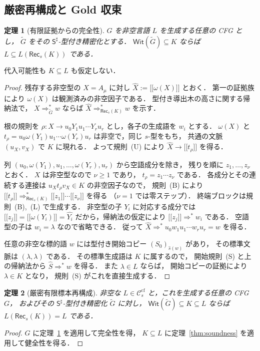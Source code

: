 \documentclass[11pt,a4paper]{ltjsarticle}
\newcommand{\NT}[1]{\mathopen{[\![}#1\mathclose{]\!]}}
\newtheorem{theorem}{定理}[section]
\theoremstyle{remark}
\theoremstyle{plain}
\newcommand{\WitnessSet}{\mathsf{Wit}}
\newcommand{\cf}{\mathrm{cf}}
\newcommand{\Ccf}[1]{\mathcal C_{#1}^{\cf}}
\begin{document}
\subsection{厳密再構成と Gold 収束}

\begin{theorem}[有限証拠からの完全性]\label{thm:complete}
$G$ を非空言語 $L$ を生成する任意の CFG とし，
$\widetilde G$ をその $\mathsf S^\sharp$-型付き精密化とする．
$\WitnessSet(\widetilde G)\subseteq K$ ならば
$L\subseteq L(\mathsf{Rec}_s(K))$ である．
\end{theorem}
代入可能性も $K\subseteq L$ も仮定しない．
\begin{proof}
残存する非空型の $X=A_\mu$ に対し
$\widehat X:=\NT{\omega(X)}$ とおく．
第一の証拠族により $\omega(X)$ は観測済みの非空因子である．
型付き導出木の高さに関する帰納法で，
$X\Rightarrow_{\widetilde G}^*w$ ならば
$\widehat X\Rightarrow_{\mathsf{Rec}_s(K)}^*w$
を示す．

根の規則を
$\rho:X\to u_0Y_1u_1\cdots Y_ru_r$
とし，各子の生成語を $w_i$ とする．
$\omega(X)$ と
$t_\rho=u_0\omega(Y_1)u_1\cdots\omega(Y_r)u_r$
は非空で，同じ $s$-型をもち，
共通の文脈 $(u_X,v_X)$ で $K$ に現れる．
よって規則~\textup{(U)} により
$\widehat X\to\NT{t_\rho}$ を得る．

列 $(u_0,\omega(Y_1),u_1,\ldots,
\omega(Y_r),u_r)$ から空語成分を除き，
残りを順に $z_1,\ldots,z_\nu$ とおく．
$X$ は非空型なので $\nu\ge1$ であり，
$t_\rho=z_1\cdots z_\nu$ である．
各成分とその連続する連接は
$u_Xt_\rho v_X\in K$ の非空因子なので，
規則~\textup{(B)} により
$\NT{t_\rho}\Rightarrow_{\mathsf{Rec}_s(K)}^*
\NT{z_1}\cdots\NT{z_\nu}$ を得る
（$\nu=1$ では零ステップ）．
終端ブロックは規則~\textup{(B)},~\textup{(L)} で生成する．
非空型の子 $Y_i$ に対応する成分では
$\NT{z_j}=\NT{\omega(Y_i)}=\widehat{Y_i}$
だから，帰納法の仮定により
$\NT{z_j}\Rightarrow^*w_i$ である．
空語型の子は $w_i=\lambda$ なので省略できる．
従って $\widehat X\Rightarrow^*
u_0w_1u_1\cdots w_ru_r=w$ を得る．

任意の非空な標的語 $w$ には型付き開始コピー
$(S_0)_{\widehat s(w)}$ があり，
その標準文脈は $(\lambda,\lambda)$ である．
その標準生成語は $K$ に属するので，
開始規則~\textup{(S)} と上の帰納法から
$\widehat S\Rightarrow^*w$ を得る．
また $\lambda\in L$ ならば，
開始コピーの証拠により $\lambda\in K$ となり，
規則~\textup{(S)} がこれを直接生成する．
\end{proof}

\begin{theorem}[厳密有限標本再構成]
\label{thm:reconstruction-fixed-s}
非空な $L\in\Ccf{s}$ と，これを生成する任意の CFG $G$，
およびその $\mathsf S^\sharp$-型付き精密化 $\widetilde G$ に対し，
$\WitnessSet(\widetilde G)\subseteq K\subseteq L$ ならば
$L(\mathsf{Rec}_s(K))=L$ である．
\end{theorem}
\begin{proof}
$G$ に定理~\ref{thm:complete} を適用して完全性を得，
$K\subseteq L$ に定理~\ref{thm:soundness} を適用して健全性を得る．
\end{proof}
\end{document}

